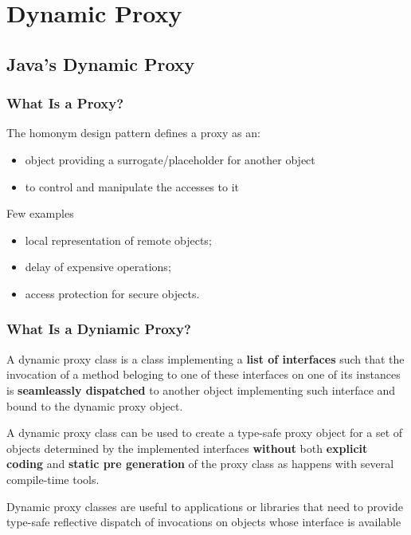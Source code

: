 \section{Dynamic Proxy}

\subsection{Java's Dynamic Proxy}

\subsubsection{What Is a Proxy?}

The homonym design pattern defines a proxy as an:

\begin{itemize}
	\item object providing a surrogate/placeholder for another object
	\item to control and manipulate the accesses to it
\end{itemize}

Few examples

\begin{itemize}
	\item local representation of remote objects;
	\item delay of expensive operations;
	\item access protection for secure objects.
\end{itemize}

\subsubsection{What Is a Dyniamic Proxy?}

A dynamic proxy class is a class implementing a \textbf{list of interfaces} such that the invocation of a method beloging to one of these interfaces on one of its instances is \textbf{seamleassly dispatched} to another object implementing such interface and bound to the dynamic proxy object.

A dynamic proxy class can be used to create a type-safe proxy object for a set of objects determined by the implemented interfaces \textbf{without} both \textbf{explicit coding} and \textbf{static pre generation} of the proxy class as happens with several compile-time tools.

Dynamic proxy classes are useful to applications or libraries that need to provide type-safe reflective dispatch of invocations on objects whose interface is available


